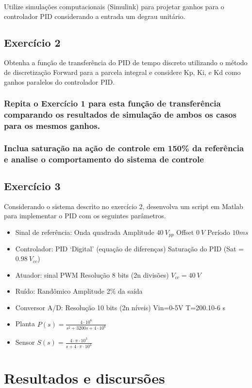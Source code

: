 Utilize simulações computacionais (Simulink\textregistered) para projetar ganhos para o controlador PID considerando a entrada um degrau unitário.

\subsection{Exercício 2}

Obtenha a função de transferência do PID de tempo discreto utilizando o método de discretização Forward para a parcela integral e considere Kp, Ki, e Kd como ganhos paralelos do controlador PID.

\subsubsection{Repita o Exercício 1 para esta função de transferência comparando os resultados de simulação de ambos os casos para os mesmos ganhos.}

\subsubsection{Inclua saturação na ação de controle em 150\% da referência e analise o comportamento do sistema de controle}

\subsection{Exercício 3}
Considerando o sistema descrito no exercício 2, desenvolva um script em Matlab para implementar o PID com os seguintes parâmetros.

\begin{itemize}
	\item Sinal de referência:
		Onda quadrada
		Amplitude $40~V_{pp}$
		Offset $0~V$
		Período $10ms$
	\item Controlador:
		PID ‘Digital’ (equação de diferenças)
		Saturação do PID (Sat = $0.98~V_{cc}$)
	\item Atuador: sinal PWM
		Resolução 8 bits (2n divisões)
		$V_{cc}=40~V$
	\item Ruído:
		Randômico
		Amplitude 2\% da saída
	\item Conversor A/D:
		Resolução 10 bits (2n níveis)
		Vin=0-5V
		T=200.10-6 s
	\item Planta
		$P(s)=\frac{4 \cdot 10^{6}}{s^{2}+3200s+4 \cdot 10^{6}}$
	\item Sensor
		$S(s)=\frac{4 \cdot \pi \cdot 10^{3}}{s + 4 \cdot \pi \cdot 10^{3}}$
\end{itemize}

\section{Resultados e discursões}